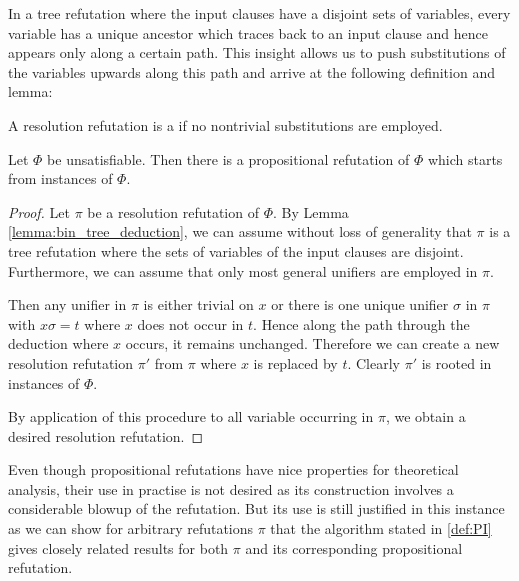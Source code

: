 In a tree refutation where the input clauses have a disjoint sets of variables, every variable has a unique ancestor which traces back to an input clause and hence appears only along a certain path.
This insight allows us to push substitutions of the variables upwards along this path and arrive at the following definition and lemma:




\begin{defi}
	A resolution refutation is a  if no nontrivial substitutions are employed.
\end{defi}

\begin{lemma}
	Let $\Phi$ be unsatisfiable.
	Then there is a propositional refutation of $\Phi$ which starts from instances of $\Phi$.
\end{lemma}
\begin{proof}
	Let $\pi$ be a resolution refutation of $\Phi$.
	By Lemma \ref{lemma:bin_tree_deduction}, we can assume without loss of generality that $\pi$ is a tree refutation where the sets of variables of the input clauses are disjoint.
	Furthermore, we can assume that only most general unifiers are employed in $\pi$.

	Then any unifier in $\pi$ is either trivial on $x$ or there is one unique unifier $\sigma$ in $\pi$ with $x\sigma = t$ where $x$ does not occur in $t$.
	Hence along the path through the deduction where $x$ occurs, it remains unchanged.
	Therefore we can create a new resolution refutation $\pi'$ from $\pi$ where $x$ is replaced by $t$.
	Clearly $\pi'$ is rooted in instances of $\Phi$.

	By application of this procedure to all variable occurring in $\pi$, we obtain a desired resolution refutation.
\end{proof}

Even though propositional refutations have nice properties for theoretical analysis, their use in practise is not desired as its construction involves a considerable blowup of the refutation. 
But its use is still justified in this instance as we can show for arbitrary refutations $\pi$
that the algorithm stated in \ref{def:PI} gives closely related results for both $\pi$ and its corresponding propositional refutation.

